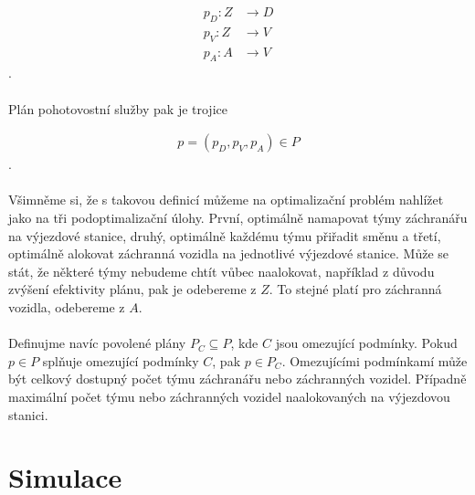 \begin{align}
p_D \colon Z &\rightarrow D \\
p_V \colon Z &\rightarrow V \\
p_A \colon A &\rightarrow V 
\end{align}
.
\\
\\
Plán pohotovostní služby pak je trojice

\begin{align}
p = (p_D, p_V, p_A) \in P
\end{align}
.
\\
\\
Všimněme si, že s takovou definicí můžeme na optimalizační problém nahlížet jako na tři podoptimalizační úlohy.
První, optimálně namapovat týmy záchranářu na výjezdové stanice, druhý, optimálně každému týmu přiřadit směnu a třetí, optimálně alokovat záchranná vozidla na jednotlivé výjezdové stanice.
Může se stát, že některé týmy nebudeme chtít vůbec naalokovat, například z důvodu zvýšení efektivity plánu, pak je odebereme z $Z$. To stejné platí pro záchranná vozidla, odebereme z $A$.
\\
\\
Definujme navíc povolené plány $P_C \subseteq P$, kde $C$ jsou omezující podmínky. Pokud $p \in P$ splňuje omezující podmínky $C$, pak $p \in P_C$. 
Omezujícími podmínkamí může být celkový dostupný počet týmu záchranářu nebo záchranných vozidel. Případně maximální počet týmu nebo záchranných vozidel naalokovaných na výjezdovou stanici.

\section{Simulace}

